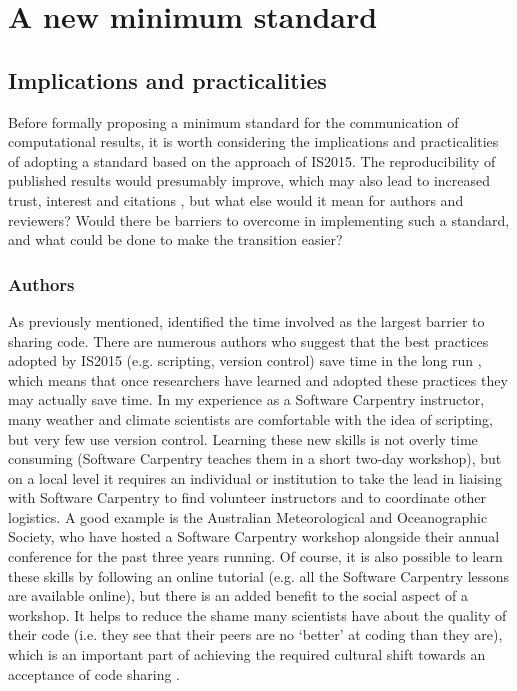 \section{A new minimum standard}

\subsection{Implications and practicalities}

Before formally proposing a minimum standard for the communication of computational results, it is worth considering the implications and practicalities of adopting a standard based on the approach of IS2015. The reproducibility of published results would presumably improve, which may also lead to increased trust, interest and citations \citep{Piwowar2007}, but what else would it mean for authors and reviewers? Would there be barriers to overcome in implementing such a standard, and what could be done to make the transition easier?

\subsubsection{Authors}

As previously mentioned, \citet{Stodden2010} identified the time involved as the largest barrier to sharing code. There are numerous authors who suggest that the best practices adopted by IS2015 (e.g. scripting, version control) save time in the long run \citep[e.g.][]{Sandve2013,Wilson2014a}, which means that once researchers have learned and adopted these practices they may actually save time. In my experience as a Software Carpentry \citep{Wilson2014} instructor, many weather and climate scientists are comfortable with the idea of scripting, but very few use version control. Learning these new skills is not overly time consuming (Software Carpentry teaches them in a short two-day workshop), but on a local level it requires an individual or institution to take the lead in liaising with Software Carpentry to find volunteer instructors and to coordinate other logistics. A good example is the Australian Meteorological and Oceanographic Society, who have hosted a Software Carpentry workshop alongside their annual conference for the past three years running. Of course, it is also possible to learn these skills by following an online tutorial (e.g. all the Software Carpentry lessons are available online), but there is an added benefit to the social aspect of a workshop. It helps to reduce the shame many scientists have about the quality of their code (i.e. they see that their peers are no `better' at coding than they are), which is an important part of achieving the required cultural shift towards an acceptance of code sharing \citep{Barnes2010}.

